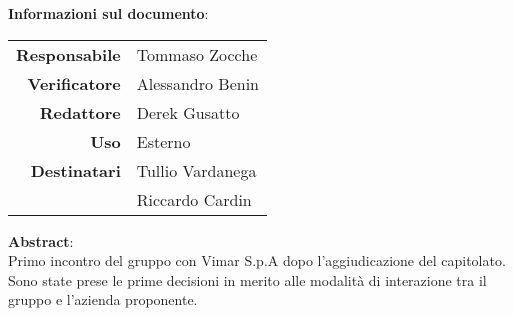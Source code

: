 \begin{center}
\textbf{Informazioni sul documento}: \\
\vspace{0.5cm}

\begin{tabular}{r|l}
    \textbf{Responsabile} &  Tommaso Zocche\\ 
    \textbf{Verificatore} & Alessandro Benin \\ 
    \textbf{Redattore} &     Derek Gusatto\\ 
    \textbf{Uso} & Esterno \\ 
    \textbf{Destinatari} & Tullio Vardanega \\ & Riccardo Cardin \\ 
\end{tabular}

\vfill

\textbf{Abstract}: \\
\vspace{0.5cm}
Primo incontro del gruppo con Vimar S.p.A dopo l'aggiudicazione del capitolato. Sono state prese le prime decisioni in merito alle modalità di interazione tra il gruppo e l'azienda proponente.
\end{center}


\bigskip